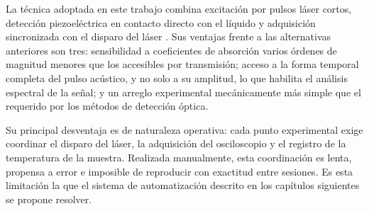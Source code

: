 La técnica adoptada en este trabajo combina excitación por pulsos
láser cortos, detección piezoeléctrica en contacto directo con el
líquido y adquisición sincronizada con el disparo del láser
\cite{PatelTam1981}. Sus ventajas frente a las alternativas
anteriores son tres: sensibilidad a coeficientes de absorción
varios órdenes de magnitud menores que los accesibles por
transmisión; acceso a la forma temporal completa del pulso
acústico, y no solo a su amplitud, lo que habilita el análisis
espectral de la señal; y un arreglo experimental mecánicamente más
simple que el requerido por los métodos de detección óptica.

Su principal desventaja es de naturaleza operativa: cada punto
experimental exige coordinar el disparo del láser, la adquisición
del osciloscopio y el registro de la temperatura de la muestra. Realizada manualmente,
esta coordinación es lenta, propensa a error e imposible de
reproducir con exactitud entre sesiones. Es esta limitación la que
el sistema de automatización descrito en los capítulos siguientes
se propone resolver.
